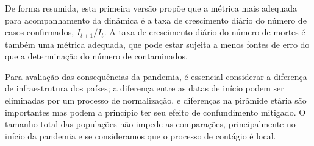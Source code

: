 \documentclass[12pt]{extarticle}
\begin{document}
De forma resumida, esta primeira versão propõe que a métrica mais adequada para acompanhamento da dinâmica é a taxa de crescimento diário do número de casos confirmados, $I_{t+1} / I_{t}$. A taxa de crescimento diário do número de mortes é também uma métrica adequada, que pode estar sujeita a menos fontes de erro do que a determinação do número de contaminados.

Para avaliação das consequências da pandemia, é essencial considerar a diferença de infraestrutura dos países; a diferença entre as datas de início podem ser eliminadas por um processo de normalização, e diferenças na pirâmide etária são importantes mas podem a princípio ter seu efeito de confundimento mitigado. O tamanho total das populações não impede as comparações, principalmente no início da pandemia e se consideramos que o processo de contágio é local.



\end{document}

